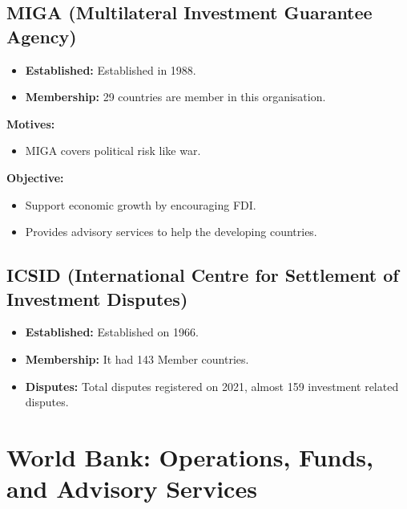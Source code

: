 \subsection{MIGA (Multilateral Investment Guarantee Agency)}
\begin{formulabox}
\begin{itemize}[leftmargin=*, noitemsep]
    \item \textbf{Established:} Established in 1988.
    \item \textbf{Membership:} 29 countries are member in this organisation.
\end{itemize}
\end{formulabox}

\noindent\textbf{Motives:}
\begin{itemize}[leftmargin=*]
    \item MIGA covers political risk like war.
\end{itemize}

\noindent\textbf{Objective:}
\begin{itemize}[leftmargin=*]
    \item Support economic growth by encouraging FDI.
    \item Provides advisory services to help the developing countries.
\end{itemize}

\subsection{ICSID (International Centre for Settlement of Investment Disputes)}
\begin{formulabox}
\begin{itemize}[leftmargin=*, noitemsep]
    \item \textbf{Established:} Established on 1966.
    \item \textbf{Membership:} It had 143 Member countries.
    \item \textbf{Disputes:} Total disputes registered on 2021, almost 159 investment related disputes.
\end{itemize}
\end{formulabox}

\section{World Bank: Operations, Funds, and Advisory Services}

